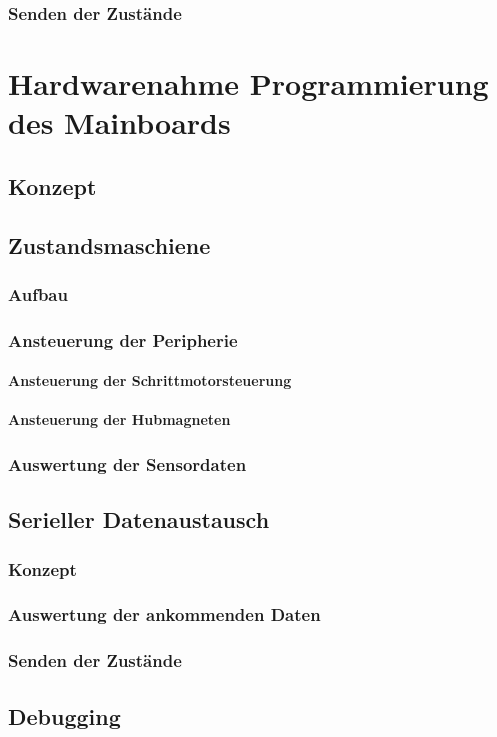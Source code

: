 \subsubsection{Senden der Zustände}





\section{Hardwarenahme Programmierung des Mainboards}
\label{sec:board}
\subsection{Konzept}
\subsection{Zustandsmaschiene}
\subsubsection{Aufbau}
\subsubsection{Ansteuerung der Peripherie}
\paragraph{Ansteuerung der Schrittmotorsteuerung}
\paragraph{Ansteuerung der Hubmagneten}
\subsubsection{Auswertung der Sensordaten}

\subsection{Serieller Datenaustausch}
\subsubsection{Konzept}
\subsubsection{Auswertung der ankommenden Daten}
\subsubsection{Senden der Zustände}


\subsection{Debugging}



